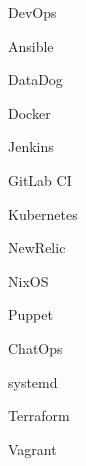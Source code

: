 \begin{skillset}{DevOps}
  \item Ansible
  \item DataDog
  \item Docker
  \item Jenkins
  \item GitLab CI
  \item Kubernetes
  \item NewRelic
  \item NixOS
  \item Puppet
  \item ChatOps
  \item systemd
  \item Terraform
  \item Vagrant
\end{skillset}
